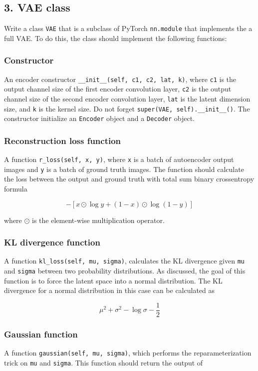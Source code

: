 \documentclass{article}
\begin{document}
\subsection*{3. VAE class}
Write a class \texttt{VAE} that is a subclass of PyTorch \texttt{nn.module} that implements the a full VAE. To do this, the class should implement the following functions:
\subsubsection*{Constructor}
An encoder constructor \texttt{\_\_init\_\_(self, c1, c2, lat, k)}, where \texttt{c1} is the output channel size of the first encoder convolution layer, \texttt{c2} is the output channel size of the second encoder convolution layer, \texttt{lat} is the latent dimension size, and \texttt{k} is the kernel size. Do not forget \texttt{super(VAE, self).\_\_init\_\_()}. The constructor initialize an \texttt{Encoder} object and a \texttt{Decoder} object.

\subsubsection*{Reconstruction loss function}
A function \texttt{r\_loss(self, x, y)}, where \texttt{x} is a batch of autoencoder output images and  \texttt{y} is a batch of ground truth images. The function should calculate the loss between the output and ground truth with total sum binary crossentropy formula

\[-[x \odot \log y + (1 - x) \odot \log(1 - y)]\] 

\noindent
where $\odot$ is the element-wise multiplication operator.

\subsubsection*{KL divergence function}
A function \texttt{kl\_loss(self, mu, sigma)}, calculates the KL divergence given \texttt{mu} and \texttt{sigma} between two probability distributions. As discussed, the goal of this function is to force the latent space into a normal distribution. The KL divergence for a normal distribution in this case can be calculated as

\[\mu ^ 2 + \sigma ^ 2 - \log\sigma - \frac{1}{2}\]

\subsubsection*{Gaussian function}
A function \texttt{gaussian(self, mu, sigma)}, which performs the reparameterization trick on \texttt{mu} and \texttt{sigma}. This function should return the output of 
\end{document}
